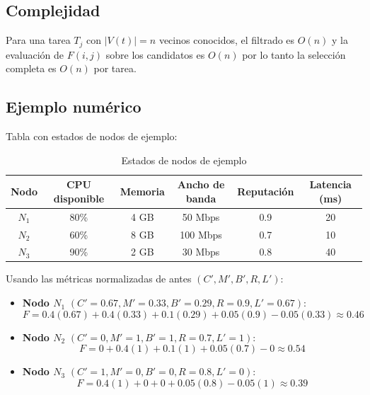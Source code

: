 \documentclass{article}
\begin{document}
\subsection{Complejidad}
Para una tarea $T_j$ con $|V(t)| = n$ vecinos conocidos, el filtrado es $O(n)$ y la evaluación de $F(i,j)$ sobre los candidatos es $O(n)$ por lo tanto la selección completa es $O(n)$ por tarea.

\subsection{Ejemplo numérico}
Tabla con estados de nodos de ejemplo:

\begin{table}[h!]
\centering
\caption{Estados de nodos de ejemplo}
\begin{tabular}{c c c c c c}
\hline
\textbf{Nodo} & \textbf{CPU disponible} & \textbf{Memoria} & \textbf{Ancho de banda} & \textbf{Reputación} & \textbf{Latencia (ms)} \\ \hline
$N_1$ & 80\% & 4 GB & 50 Mbps  & 0.9 & 20 \\
$N_2$ & 60\% & 8 GB & 100 Mbps & 0.7 & 10 \\
$N_3$ & 90\% & 2 GB & 30 Mbps  & 0.8 & 40 \\ \hline
\end{tabular}
\end{table}

Usando las métricas normalizadas de antes $(C', M', B', R, L')$:
\begin{itemize}
    \item \textbf{Nodo $N_1$} $(C'=0.67, M'=0.33, B'=0.29, R=0.9, L'=0.67)$:
    \begin{equation*}
    F = 0.4(0.67) + 0.4(0.33) + 0.1(0.29) + 0.05(0.9) - 0.05(0.33) \approx 0.46
    \end{equation*}

    \item \textbf{Nodo $N_2$} $(C'=0, M'=1, B'=1, R=0.7, L'=1)$:
    \begin{equation*}
    F = 0 + 0.4(1) + 0.1(1) + 0.05(0.7) - 0 \approx 0.54
    \end{equation*}

    \item \textbf{Nodo $N_3$} $(C'=1, M'=0, B'=0, R=0.8, L'=0)$:
    \begin{equation*}
    F = 0.4(1) + 0 + 0 + 0.05(0.8) - 0.05(1) \approx 0.39
    \end{equation*}
\end{itemize}
\end{document}
